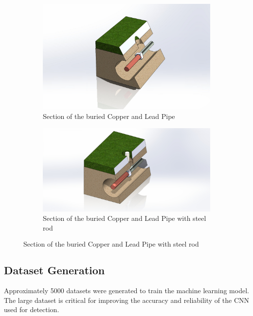 \begin{figure}[t]
    \centering
    \begin{subfigure}[b]{0.4\textwidth}
        \centering
        \includegraphics[width=\textwidth]{./Section_2.png}
        \caption{Section of the buried Copper and Lead Pipe}
        \label{fig:sub1}
    \end{subfigure}
    \hfill
    \begin{subfigure}[b]{0.4\textwidth}
        \centering

        \includegraphics[width=\textwidth]{./Complete.jpg}
        \caption{Section of the buried Copper and Lead Pipe with steel rod}
        \label{fig:sub2}
    \end{subfigure}
    \caption{Section of the buried Copper and Lead Pipe with steel rod}
    \label{fig:main}
\end{figure}



\subsection{Dataset Generation}
Approximately 5000 datasets were generated to train the machine learning model. The large dataset is critical for improving the accuracy and reliability of the CNN used for detection.

